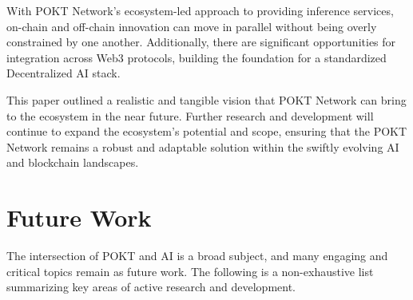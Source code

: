 \documentclass[conference,compsoc]{IEEEtran}
\begin{document}
With POKT Network’s ecosystem-led approach to providing inference services, on-chain and off-chain innovation can move in parallel without being overly constrained by one another. Additionally, there are significant opportunities for integration across Web3 protocols, building the foundation for a standardized Decentralized AI stack.

This paper outlined a realistic and tangible vision that POKT Network can bring to the ecosystem in the near future. Further research and development will continue to expand the ecosystem's potential and scope, ensuring that the POKT Network remains a robust and adaptable solution within the swiftly evolving AI and blockchain landscapes.

\section{Future Work}
The intersection of POKT and AI is a broad subject, and many engaging and critical topics remain as future work. The following is a non-exhaustive list summarizing key areas of active research and development.
\end{document}
